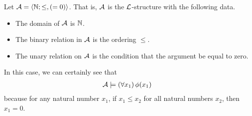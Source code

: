 \begin{boxcexample}
    Let $\mathcal{A} = \left\langle \mathbb{N}; \le, \left( = 0 \right) \right\rangle$. That is, $\mathcal{A}$ is the $\mathcal{L}$-structure with the following data.
    \begin{itemize}
        \item The domain of $\mathcal{A}$ is $\mathbb{N}$.
        \item The binary relation in $\mathcal{A}$ is the ordering $\le$.
        \item The unary relation on $\mathcal{A}$ is the condition that the argument be equal to zero.
    \end{itemize}
    In this case, we can certainly see that
    \begin{align*}
        \mathcal{A} \models \left( \forall x_1 \right)\phi\!\left( x_1 \right)
    \end{align*}
    because for any natural number $x_1$, if $x_1 \leq x_2$ for all natural numbers $x_2$, then $x_1 = 0$.
    \sorry
\end{boxcexample}

\sorry

